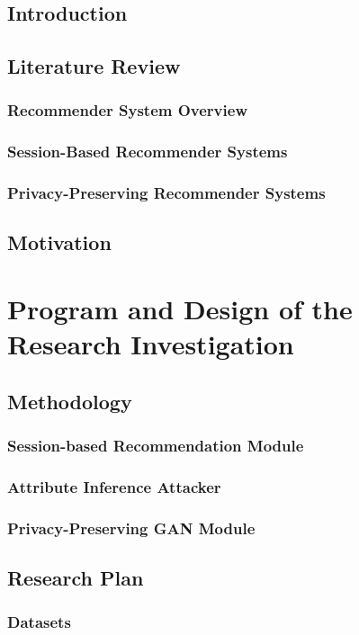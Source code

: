 \documentclass[12pt,a4paper]{article}
\begin{document}
\subsection{Introduction}
\subsection{Literature Review}
\subsubsection{Recommender System Overview}
\subsubsection{Session-Based Recommender Systems}
\subsubsection{Privacy-Preserving Recommender Systems}
\subsection{Motivation}

\section{Program and Design of the Research Investigation}
\subsection{Methodology}
\subsubsection{Session-based Recommendation Module}
\subsubsection{Attribute Inference Attacker}
\subsubsection{Privacy-Preserving GAN Module}
\subsection{Research Plan}
\subsubsection{Datasets}
\end{document}
